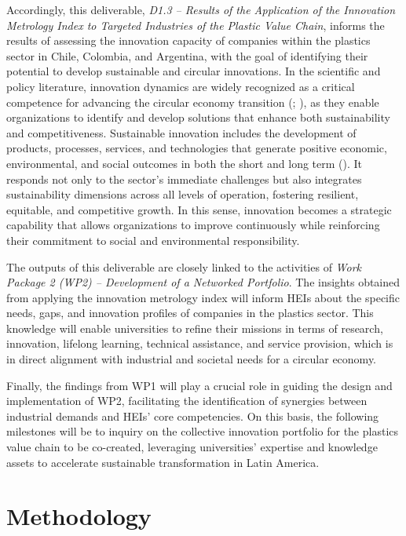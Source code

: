 \documentclass[
  12pt,
  oneside]{book}
\begin{document}
Accordingly, this deliverable, \emph{D1.3 -- Results of the Application
of the Innovation Metrology Index to Targeted Industries of the Plastic
Value Chain}, informs the results of assessing the innovation capacity
of companies within the plastics sector in Chile, Colombia, and
Argentina, with the goal of identifying their potential to develop
sustainable and circular innovations. In the scientific and policy
literature, innovation dynamics are widely recognized as a critical
competence for advancing the circular economy transition
(;
),
as they enable organizations to identify and develop solutions that
enhance both sustainability and competitiveness. Sustainable innovation
includes the development of products, processes, services, and
technologies that generate positive economic, environmental, and social
outcomes in both the short and long term
(). It responds not
only to the sector's immediate challenges but also integrates
sustainability dimensions across all levels of operation, fostering
resilient, equitable, and competitive growth. In this sense, innovation
becomes a strategic capability that allows organizations to improve
continuously while reinforcing their commitment to social and
environmental responsibility.

The outputs of this deliverable are closely linked to the activities of
\emph{Work Package 2 (WP2) -- Development of a Networked Portfolio}. The
insights obtained from applying the innovation metrology index will
inform HEIs about the specific needs, gaps, and innovation profiles of
companies in the plastics sector. This knowledge will enable
universities to refine their missions in terms of research, innovation,
lifelong learning, technical assistance, and service provision, which is
in direct alignment with industrial and societal needs for a circular
economy.

Finally, the findings from WP1 will play a crucial role in guiding the
design and implementation of WP2, facilitating the identification of
synergies between industrial demands and HEIs' core competencies. On
this basis, the following milestones will be to inquiry on the
collective innovation portfolio for the plastics value chain to be
co-created, leveraging universities' expertise and knowledge assets to
accelerate sustainable transformation in Latin America.

\chapter{Methodology}\label{methodology}
\end{document}
